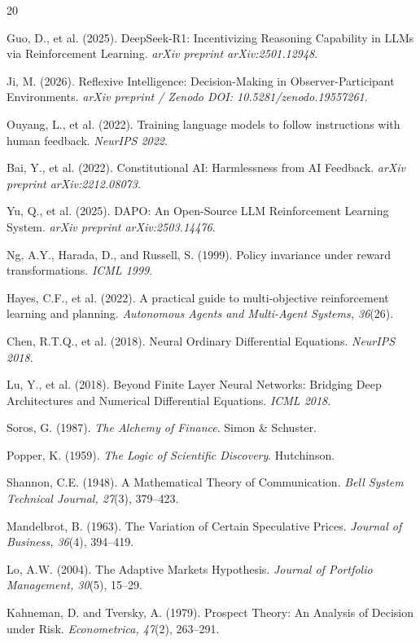 \documentclass{article}
\begin{document}
\begin{thebibliography}{20}

Guo, D., et al. (2025).
DeepSeek-R1: Incentivizing Reasoning Capability in LLMs via Reinforcement Learning.
\textit{arXiv preprint arXiv:2501.12948}.

Ji, M. (2026).
Reflexive Intelligence: Decision-Making in Observer-Participant Environments.
\textit{arXiv preprint / Zenodo DOI: 10.5281/zenodo.19557261}.

Ouyang, L., et al. (2022).
Training language models to follow instructions with human feedback.
\textit{NeurIPS 2022}.

Bai, Y., et al. (2022).
Constitutional AI: Harmlessness from AI Feedback.
\textit{arXiv preprint arXiv:2212.08073}.

Yu, Q., et al. (2025).
DAPO: An Open-Source LLM Reinforcement Learning System.
\textit{arXiv preprint arXiv:2503.14476}.

Ng, A.Y., Harada, D., and Russell, S. (1999).
Policy invariance under reward transformations.
\textit{ICML 1999}.

Hayes, C.F., et al. (2022).
A practical guide to multi-objective reinforcement learning and planning.
\textit{Autonomous Agents and Multi-Agent Systems, 36}(26).

Chen, R.T.Q., et al. (2018).
Neural Ordinary Differential Equations.
\textit{NeurIPS 2018}.

Lu, Y., et al. (2018).
Beyond Finite Layer Neural Networks: Bridging Deep Architectures and Numerical Differential Equations.
\textit{ICML 2018}.

Soros, G. (1987).
\textit{The Alchemy of Finance}.
Simon \& Schuster.

Popper, K. (1959).
\textit{The Logic of Scientific Discovery}.
Hutchinson.

Shannon, C.E. (1948).
A Mathematical Theory of Communication.
\textit{Bell System Technical Journal, 27}(3), 379--423.

Mandelbrot, B. (1963).
The Variation of Certain Speculative Prices.
\textit{Journal of Business, 36}(4), 394--419.

Lo, A.W. (2004).
The Adaptive Markets Hypothesis.
\textit{Journal of Portfolio Management, 30}(5), 15--29.

Kahneman, D. and Tversky, A. (1979).
Prospect Theory: An Analysis of Decision under Risk.
\textit{Econometrica, 47}(2), 263--291.

\end{thebibliography}
\end{document}
